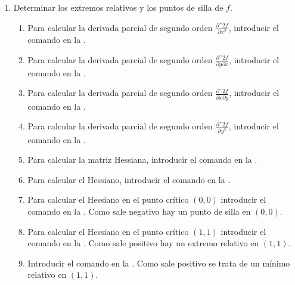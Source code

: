 \begin{enumerate}[leftmargin=*]
\begin{enumerate}
      \item Determinar los extremos relativos y los puntos de silla de $f$.
            \begin{indication}
            \begin{enumerate}
            \item Para calcular la derivada parcial de segundo orden $\frac{\partial\^2 f}{\partial x^2}$, introducir el comando  en la .
            \item Para calcular la derivada parcial de segundo orden $\frac{\partial\^2 f}{\partial y\partial x}$, introducir el comando  en la .
            \item Para calcular la derivada parcial de segundo orden $\frac{\partial\^2 f}{\partial x\partial y}$, introducir el comando  en la .
            \item Para calcular la derivada parcial de segundo orden $\frac{\partial\^2 f}{\partial y^2}$, introducir el comando  en la .
            \item Para calcular la matriz Hessiana, introducir el comando  en la .
            \item Para calcular el Hessiano, introducir el comando  en la .
            \item Para calcular el Hessiano en el punto crítico $(0,0)$ introducir el comando  en la . Como sale negativo hay un punto de silla en $(0,0)$.
            \item Para calcular el Hessiano en el punto crítico $(1,1)$ introducir el comando  en la . Como sale positivo hay un extremo relativo en $(1,1)$.
            \item Introducir el comando  en la . Como sale positivo se trata de un mínimo relativo en $(1,1)$.
            \end{enumerate}
            \end{indication}
      \end{enumerate}

\end{enumerate}


